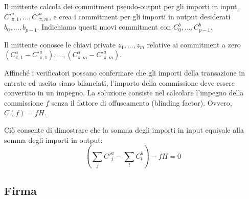 Il mittente calcola dei commitment pseudo-output per gli importi in input, $C'^a_{\pi,1}, ..., C'^a_{\pi,m}$, e crea i commitment per gli importi in output desiderati $b_0, ..., b_{p-1}$. Indichiamo questi nuovi commitment con $C^b_0, ..., C^b_{p-1}$.

Il mittente conosce le chiavi private $z_1,...,z_m$ relative ai commitment a zero $(C^a_{\pi,1} - C'^a_{\pi,1}),...,(C^a_{\pi,m} - C'^a_{\pi,m})$.

Affinché i verificatori possano confermare che gli importi della transazione in entrate ed uscita siano bilanciati, l'importo della commissione deve essere convertito in un impegno. La soluzione consiste nel calcolare l’impegno della commissione $f$ senza il fattore di offuscamento (blinding factor). Ovvero, $C(f) = f H$.

Ciò consente di dimostrare che la somma degli importi in input equivale alla somma degli importi in output:\\
\[(\sum_j C'^a_{j} - \sum_t C^b_{t}) - f H = 0\]


\subsection{Firma}
\label{full-signature}

